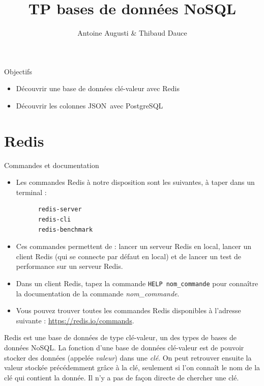 \documentclass[a4paper,10pt]{article}
\title{TP bases de données NoSQL}
\date{}
\author{Antoine Augusti \& Thibaud Dauce}
\begin{document}
\maketitle
\sloppy
\begin{bclogo}[logo = \bclampe, arrondi = 0.1, ombre = true, epOmbre = 0.2, couleurOmbre = black!30, couleurBord=bleuF, barre=none]{Objectifs}
  \begin{itemize}
   \item Découvrir une base de données clé-valeur avec Redis
   \item Découvrir les colonnes JSON avec PostgreSQL
  \end{itemize}
\end{bclogo}

\section{Redis}
  \begin{bclogo}[logo = \bctakecare, arrondi = 0.1, ombre = true , epOmbre = 0.1, couleurOmbre = black!30,  barre =none, couleurBarre=bleuF]{Commandes et documentation}
    \begin{itemize}
    \item[$\bullet$] Les commandes Redis à notre disposition sont les suivantes, à taper dans un terminal :
    \begin{verbatim}
      redis-server
      redis-cli
      redis-benchmark
    \end{verbatim}
    \item[] Ces commandes permettent de : lancer un serveur Redis en local, lancer un client Redis (qui se connecte par défaut en local) et de lancer un test de performance sur un serveur Redis.
    \item[$\bullet$] Dans un client Redis, tapez la commande \texttt{HELP nom\_commande} pour connaître la documentation de la commande \textit{nom\_commande}.
    \item[$\bullet$] Vous pouvez trouver toutes les commandes Redis disponibles à l'adresse suivante : \url{https://redis.io/commands}.

   \end{itemize}
  \end{bclogo}

  Redis est une base de données de type clé-valeur, un des types de bases de données NoSQL. La fonction d'une base de données clé-valeur est de pouvoir stocker des données (appelée \textit{valeur}) dans une \textit{clé}. On peut retrouver ensuite la valeur stockée précédemment grâce à la clé, seulement si l'on connaît le nom de la clé qui contient la donnée. Il n'y a pas de façon directe de chercher une clé.\\
\end{document}

